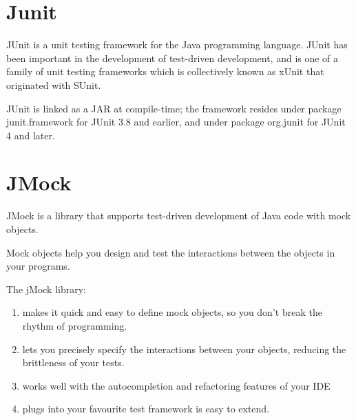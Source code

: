 \documentclass[./report.tex]{subfiles}
\begin{document}
\section{Junit}
\par JUnit is a unit testing framework for the Java programming language. JUnit has been important in the development of test-driven development, and is one of a family of unit testing frameworks which is collectively known as xUnit that originated with SUnit.
\par JUnit is linked as a JAR at compile-time; the framework resides under package junit.framework for JUnit 3.8 and earlier, and under package org.junit for JUnit 4 and later.
\section{JMock}
\par JMock is a library that supports test-driven development of Java code with mock objects.
\par Mock objects help you design and test the interactions between the objects in your programs.

\par The jMock library:
\begin{enumerate} 
\item makes it quick and easy to define mock objects, so you don't break the rhythm of programming.
\item lets you precisely specify the interactions between your objects, reducing the brittleness of your tests.
\item works well with the autocompletion and refactoring features of your IDE
\item plugs into your favourite test framework is easy to extend.
\end{enumerate}
\end{document}

